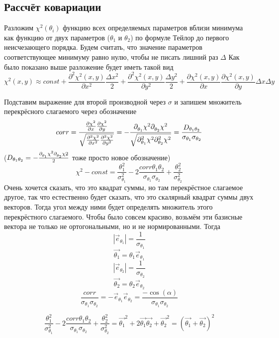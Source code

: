\documentclass[a4paper,12pt]{article}
\renewcommand{\d}[2][ ]{%
\partial^{#1}_{#2}}
\begin{document}
\subsection{Рассчёт ковариации}

Разложим $\chi^2(\theta_i)$ функцию всех определяемых параметров вблизи минимума
как функцию от двух параметров ($\theta_1$ и $\theta_2$) по формуле Тейлор до первого неисчезающего порядка.
Будем считать, что значение параметров соответствующее минимуму равно нулю, чтобы не писать
лишний раз $\Delta$
Как было показано выше разложение будет иметь такой вид
\[ \chi^2(x, y) \approx const + \frac{\partial^2\chi^2(x, y)}{\partial x^2}\frac{\Delta x^2}{2} +
\frac{\partial^2\chi^2(x, y)}{\partial y^2}\frac{\Delta y^2}{2} + 
\frac{\partial\chi^2(x, y)}{\partial x}\frac{\partial \chi^2(x, y)}{\partial y}\Delta x \Delta y\]

Подставим выражение для второй производной через $\sigma$ и запишем множитель перекрёсного слагаемого через
обозначение 
\[corr = \frac{\frac{\partial\chi^2}{\partial x}\frac{\partial \chi^2}{\partial y}}{\sqrt{
    \frac{\partial^2\chi^2}{\partial x^2}\frac{\partial^2\chi^2}{\partial y^2}
}} =
-\frac{\d{\theta_1}\chi^2\d{\theta_2}\chi^2}{\sqrt{\d[2]{\theta_1}\chi^2\d[2]{\theta_2}\chi^2}} = \frac{D_{\theta_1\theta_2}}{\sigma_{\theta_1}\sigma_{\theta_2}}\]
($D_{\theta_1\theta_2} = -\frac{\d{\theta_1}\chi^2 \d{\theta_2}\chi 2}{2}$ тоже просто новое обозначение)
\[\chi^2-const =
\frac{\theta_1^2}{\sigma_{\theta_1}^2} - 2 \frac{corr \theta_1 \theta_2}{\sigma_{\theta_1} \sigma_{\theta_2}} + \frac{\theta_2^2}{\sigma_{\theta_2}^2}\]
Очень хочется сказать, что это квадрат суммы, но там перекрёстное слагаемое другое,
так что естественно будет сказать, что это скалярный квадрат суммы двух векторов.
Тогда угол между ними будет определять множитель этого перекрёстного слагаемого.
Чтобы было совсем красиво, возьмём эти базисные вектора не только не ортогональными, но и не нормированными.
Тогда
\[\left\lvert \vec{e}_{\theta_1} \right\rvert = \frac{1}{\sigma_{\theta_1}}\]
\[ \vec{\theta_1} = \theta_1\vec{e}_{\theta_1} \]
\[\left\lvert \vec{e}_{\theta_2} \right\rvert = \frac{1}{\sigma_{\theta_2}}\]
\[ \vec{\theta_2} = \theta_2\vec{e}_{\theta_2} \]
\[ \frac{corr}{\sigma_{\theta_1}\sigma_{\theta_2}} = -\vec{e}_{\theta_1}\vec{e}_{\theta_2} = \frac{-\cos(\alpha)}{\sigma_{\theta_1}\sigma_{\theta_2}}\]

\[ \frac{\theta_1^2}{\sigma_{\theta_1}^2} - 2 \frac{corr \theta_1 \theta_2}{\sigma_{\theta_1} \sigma_{\theta_2}} + \frac{\theta_2^2}{\sigma_{\theta_2}^2}
= \vec{\theta_1}^2 + 2\vec{\theta_1}\vec{\theta_2} + \vec{\theta_2}^2 =
(\vec{\theta_1} + \vec{\theta_2})^2 \]
\end{document}
